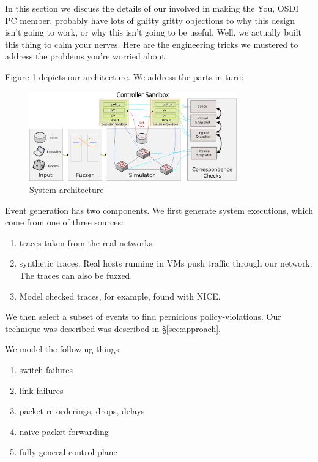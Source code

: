 
In this section we discuss the details of our  involved in making the 
You, OSDI PC member, probably have lots of gnitty gritty objections to why
this design isn't going to work, or why this isn't going to be useful. Well,
we actually built this thing to calm your nerves.
Here are the engineering tricks we mustered to address the problems
you're worried about.

Figure \ref{fig:system} depicts our architecture. We address the parts in turn:
\begin{figure}[!t]
  \centering
  \includegraphics[width=0.8\textwidth]{../diagrams/architecture/architecture.pdf}
  \caption{System architecture}
  \label{fig:system}
\end{figure}

 Event generation has two components.
We first generate system executions, which come from one of three sources:
\begin{enumerate}
\item traces taken from the real networks
\item synthetic traces. Real hosts running in VMs push traffic through our
network. The traces can also be fuzzed. 
\item Model checked traces, for example, found with NICE.
\end{enumerate}

We then select a subset of events to find pernicious policy-violations. Our
technique was described was described in \S\ref{sec:approach}.

 We model the following things: 
\begin{enumerate}
\item switch failures
\item link failures
\item packet re-orderings, drops, delays
\item naive packet forwarding
\item fully general control plane
\end{enumerate}

